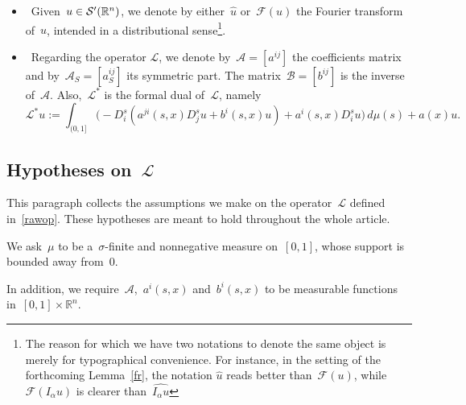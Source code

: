 \documentclass[11pt,hyp,]{nyjm}
\numberwithin{equation}{section}
\newcommand{\R}{\mathbb{R}}
\theoremstyle{remark}
\begin{document}
\begin{itemize}
\item~Given~$u \in \mathcal{S}\rq{}(\R^n)$, we denote by either~$\widehat u$ or~$\mathcal{F}(u)$ the
Fourier transform of~$u$, intended in a distributional sense\footnote{  The reason for which
we have two notations to denote the same object is merely for typographical convenience.
For instance, in the setting of the forthcoming Lemma~\ref{fr}, the notation
$\widehat u$ reads better than~$\mathcal{F}(u)$,
while~$\mathcal{F}(I_{\alpha}u)$ is clearer than~$\widehat{I_{\alpha}u}$}.
\item~Regarding the operator $\mathcal{L}$, we denote by~$\mathcal{A}=[a^{ij}]$ the coefficients matrix and by~$\mathcal{A}_S=[a_S^{ij}]$ its symmetric part.
The matrix~$\mathcal{B}=[b^{ij}]$ is the inverse of~$\mathcal{A}$.
Also,~$\mathcal{L}^*$  is the formal dual of~$\mathcal{L}$, namely 
\begin{equation*}
           \mathcal{L}^*u := \int_{(0,1]}  \Big( -D^s_i \left(a^{ji}(s,x)D^s_j u + b^i(s,x)u \right) + a^i(s,x) D_i^s u \Big) \, d\mu(s) + a(x) u.
\end{equation*}
\end{itemize}




\subsection{Hypotheses on~$\mathcal{L}$}\label{hyp_section}


This paragraph collects the assumptions we make on the operator~$\mathcal{L}$ defined in~\eqref{rawop}. These hypotheses are meant to hold throughout the whole article.

We ask~$\mu$ to be a~$\sigma$-finite and nonnegative measure on~$[0,1]$, whose support is bounded away from~$0$.

In addition, we require~$\mathcal{A}$,~$a^i(s,x)$ and~$b^i(s,x)$ to be measurable functions in~$[0,1]\times \R^n$.
\end{document}
